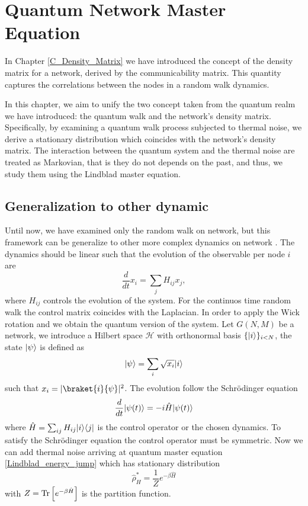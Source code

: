 \chapter{Quantum Network Master Equation}

In Chapter \ref{C_Density_Matrix} we have introduced the concept of the density matrix for a network, derived by the communicability matrix. This quantity captures the correlations between the nodes in a random walk dynamics.

In this chapter, we aim to unify the two concept taken from the quantum realm we have introduced: the quantum walk and the network's density matrix.
Specifically, by examining a quantum walk process subjected to thermal noise, we derive a stationary distribution which coincides with the network's density matrix. 
The interaction between the quantum system and the thermal noise are treated as Markovian, that is they do not depends on the past, and thus, we study them using the Lindblad master equation.






\section{Generalization to other dynamic}

Until now, we have examined only the random walk on network, but this framework can be generalize to other more complex dynamics on network \cite{De_Domenico_2023}.
The dynamics should be linear such that the evolution of the observable per node $i$ are 
\begin{equation}\label{general_dynamics}
    \frac{d}{dt} x_i = \sum_j H_{ij} x_j,
\end{equation}
where $H_{ij}$ controls the evolution of the system.
For the continuos time random walk the control matrix coincides with the Laplacian.
In order to apply the Wick rotation and we obtain the quantum version of the system.
Let $G(N,M)$ be a network, we introduce a Hilbert space $\mathcal{H}$ with orthonormal basis $\{\lvert i\rangle\}_{i<N}$, the state $\lvert\psi\rangle$ is defined as
\begin{equation}
    \lvert\psi\rangle= \sum_i\sqrt{x_i}\lvert i\rangle
\end{equation}
such that $x_i = |\braket{i}{\psi}|^2$.
The evolution follow the Schrödinger equation
\begin{equation}
    \frac{d}{dt}\lvert\psi(t)\rangle = -i\hat H\lvert\psi(t)\rangle
\end{equation}
where 
$\hat H = \sum_{ij} H_{ij} \lvert i\rangle\langle j\rvert$ is the control operator or the chosen dynamics. To satisfy the Schrödinger equation the control operator must be symmetric.
Now we can add thermal noise arriving at quantum master equation \eqref{Lindblad_energy_jump} which has stationary distribution 
\begin{equation}
    \hat\rho_H^*= \frac{1}{Z}e^{-\beta\hat H}
\end{equation}
with $Z= \operatorname{Tr}\left[e^{-\beta\hat H}\right]$ is the partition function.

